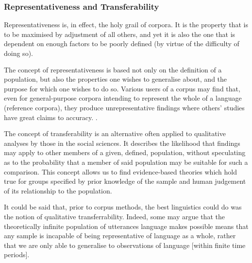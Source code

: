 




\subsubsection{Representativeness and Transferability}
Representativeness is, in effect, the holy grail of corpora.  It is the property that is to be maximised by adjustment of all others, and yet it is also the one that is dependent on enough factors to be poorly defined (by virtue of the difficulty of doing so).

The concept of representativeness is based not only on the definition of a population, but also the properties one wishes to generalise about, and the purpose for which one wishes to do so.  Various users of a corpus may find that, even for general-purpose corpora intending to represent the whole of a language (reference corpora), they produce unrepresentative findings where others' studies have great claims to accuracy. .

The concept of transferability %
is an alternative often applied to qualitative analyses by those in the social sciences.  It describes the likelihood that findings may apply to other members of a given, defined, population, without speculating as to the probability that a member of said population may be suitable for such a comparison.  This concept allows us to find evidence-based theories which hold true for groups specified by prior knowledge of the sample and human judgement of its relationship to the population.

It could be said that, prior to corpus methods, the best linguistics could do was the notion of qualitative transferrability.  Indeed, some may argue that the theoretically infinite population of utterances language makes possible means that any sample is incapable of being representative of language as a whole, rather that we are only able to generalise to observations of language [within finite time periods].

